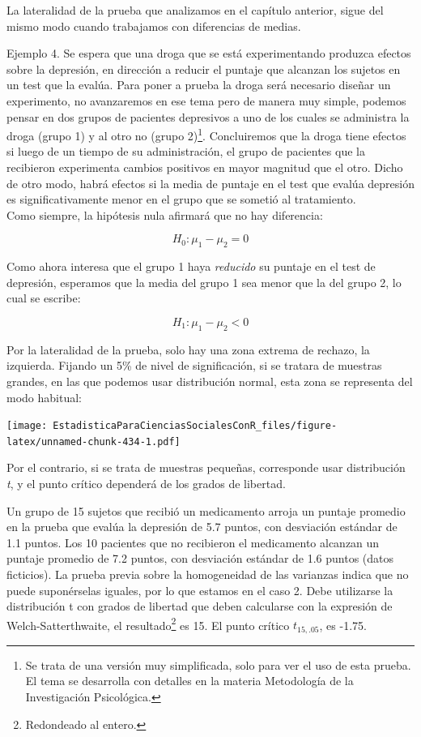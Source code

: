 \documentclass[]{book}
\let\rmarkdownfootnote\footnote%
\def\footnote{\protect\rmarkdownfootnote}
\begin{document}
La lateralidad de la prueba que analizamos en el capítulo anterior,
sigue del mismo modo cuando trabajamos con diferencias de medias.

Ejemplo 4. Se espera que una droga que se está experimentando produzca efectos sobre la depresión, en dirección a
reducir el puntaje que alcanzan los sujetos en un test que la evalúa.
Para poner a prueba la droga será necesario diseñar un experimento, no
avanzaremos en ese tema pero de manera muy simple, podemos pensar en dos
grupos de pacientes depresivos a uno de los cuales se administra la
droga (grupo 1) y al otro no (grupo 2)\footnote{Se trata de una versión muy simplificada, solo para ver el uso de esta prueba. El tema se desarrolla con detalles en la materia Metodología de la Investigación Psicológica.}. Concluiremos que la droga
tiene efectos si luego de un tiempo de su administración, el grupo de
pacientes que la recibieron experimenta cambios positivos en mayor
magnitud que el otro. Dicho de otro modo, habrá efectos si la media de
puntaje en el test que evalúa depresión es significativamente menor en
el grupo que se sometió al tratamiento.\\
Como siempre, la hipótesis nula afirmará que no hay diferencia:

\[H_{0}:\mu_{1} - \mu_{2} = 0\]

Como ahora interesa que el grupo 1 haya \emph{reducido} su puntaje en el
test de depresión, esperamos que la media del grupo 1 sea menor que la
del grupo 2, lo cual se escribe:

\[H_{1}:\mu_{1} - \mu_{2} < 0\]

Por la lateralidad de la prueba, solo hay una zona extrema de rechazo,
la izquierda. Fijando un 5\% de nivel de significación, si se tratara de
muestras grandes, en las que podemos usar distribución normal, esta zona se representa del modo habitual:

\texttt{[image: EstadisticaParaCienciasSocialesConR\_files/figure-latex/unnamed-chunk-434-1.pdf]}

Por el contrario, si se trata de muestras pequeñas, corresponde usar
distribución \emph{t}, y el punto crítico dependerá de los grados de
libertad.

Un grupo de 15 sujetos que recibió un medicamento arroja un puntaje promedio en la prueba que evalúa la depresión de 5.7 puntos, con desviación estándar de 1.1 puntos. Los 10
pacientes que no recibieron el medicamento alcanzan un puntaje promedio
de 7.2 puntos, con desviación estándar de 1.6 puntos (datos ficticios). La prueba previa
sobre la homogeneidad de las varianzas indica que no puede suponérselas
iguales, por lo que estamos en el caso 2. Debe utilizarse la
distribución t con grados de libertad que deben calcularse con la
expresión de Welch-Satterthwaite, el resultado\footnote{Redondeado al entero.} es 15. El punto
crítico \(t_{15, .05}\), es -1.75.
\end{document}
